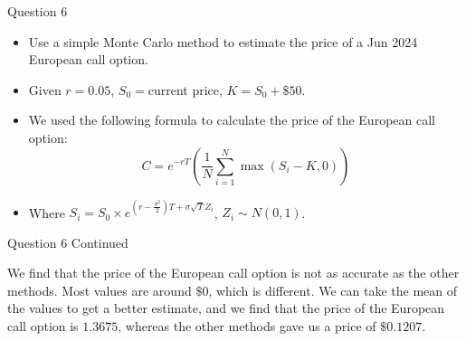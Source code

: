 \documentclass[compress,12pt]{beamer}
\begin{document}
\begin{frame}{Question 6}

      \begin{itemize}
            \item Use a simple Monte Carlo method to estimate the price of a Jun 2024 European call option.
            \item Given $r = 0.05$, $S_0 =  $current price, $K = S_0 + \$50$.
            \item We used the following formula to calculate the price of the European call option:
            \begin{equation*}
                  C = e^{-rT} \left( \frac{1}{N} \sum_{i=1}^{N} \max(S_i - K, 0) \right)
            \end{equation*}
            \item Where $S_i = S_0 \times e^{(r - \frac{\sigma^2}{2})T + \sigma \sqrt{T} Z_i}$, $Z_i \sim N(0,1)$.
      \end{itemize}

\end{frame}

\begin{frame}{Question 6 Continued}
      \begin{tcolorbox}
            We find that the price of the European call option is not as accurate as the other methods. Most values are
            around $\$0$, which is different. We can take the mean of the values to get a better estimate, and we find that 
            the price of the European call option is $\boxed{1.3675}$, whereas the other methods gave us a price of $\$0.1207$.
      \end{tcolorbox}
\end{frame}
\end{document}
